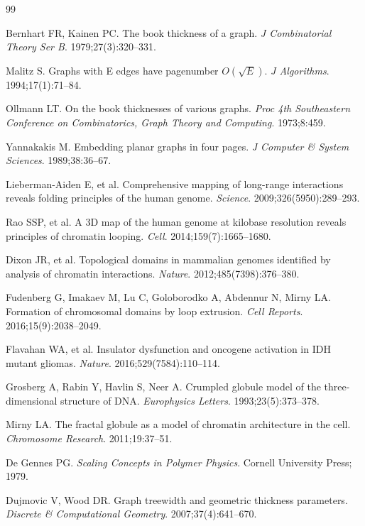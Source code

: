 \documentclass[11pt]{article}
\theoremstyle{definition}
\begin{document}
\begin{thebibliography}{99}

Bernhart FR, Kainen PC. The book thickness of a graph. \emph{J Combinatorial Theory Ser B}. 1979;27(3):320--331.

Malitz S. Graphs with E edges have pagenumber $O(\sqrt{E})$. \emph{J Algorithms}. 1994;17(1):71--84.

Ollmann LT. On the book thicknesses of various graphs. \emph{Proc 4th Southeastern Conference on Combinatorics, Graph Theory and Computing}. 1973;8:459.

Yannakakis M. Embedding planar graphs in four pages. \emph{J Computer \& System Sciences}. 1989;38:36--67.

Lieberman-Aiden E, et al. Comprehensive mapping of long-range interactions reveals folding principles of the human genome. \emph{Science}. 2009;326(5950):289--293.

Rao SSP, et al. A 3D map of the human genome at kilobase resolution reveals principles of chromatin looping. \emph{Cell}. 2014;159(7):1665--1680.

Dixon JR, et al. Topological domains in mammalian genomes identified by analysis of chromatin interactions. \emph{Nature}. 2012;485(7398):376--380.

Fudenberg G, Imakaev M, Lu C, Goloborodko A, Abdennur N, Mirny LA. Formation of chromosomal domains by loop extrusion. \emph{Cell Reports}. 2016;15(9):2038--2049.

Flavahan WA, et al. Insulator dysfunction and oncogene activation in IDH mutant gliomas. \emph{Nature}. 2016;529(7584):110--114.

Grosberg A, Rabin Y, Havlin S, Neer A. Crumpled globule model of the three-dimensional structure of DNA. \emph{Europhysics Letters}. 1993;23(5):373--378.

Mirny LA. The fractal globule as a model of chromatin architecture in the cell. \emph{Chromosome Research}. 2011;19:37--51.

De Gennes PG. \emph{Scaling Concepts in Polymer Physics}. Cornell University Press; 1979.

Dujmovic V, Wood DR. Graph treewidth and geometric thickness parameters. \emph{Discrete \& Computational Geometry}. 2007;37(4):641--670.


\end{thebibliography}
\end{document}
